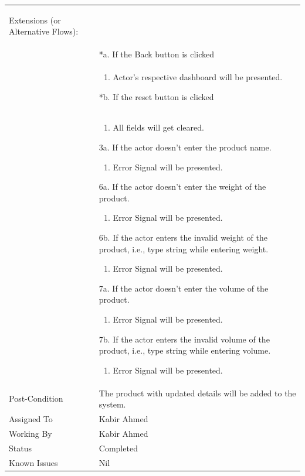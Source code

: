 \documentclass[12pt,a4paper]{article}
\begin{document}
\begin{longtable}{| p{3cm}|p{12cm}|}
\begin{enumerate}
\end{enumerate}

Extensions (or Alternative Flows):\\
& *a. If the Back button is clicked \\
& \begin{enumerate}
		\item Actor's respective dashboard will be presented.
	\end{enumerate}
*b. If the reset button is clicked \\
&	\begin{enumerate}
		\item All fields will get cleared.
	\end{enumerate}
3a. If the actor doesn't enter the product name.
 	\begin{enumerate}
		\item Error Signal will be presented.
	\end{enumerate}
6a. If the actor doesn't enter the weight of the product.
 	\begin{enumerate}
		\item Error Signal will be presented.
	\end{enumerate}
6b. If the actor enters the invalid weight of the product, i.e., type string while entering weight.
 	\begin{enumerate}
		\item Error Signal will be presented.
	\end{enumerate}
7a. If the actor doesn't enter the volume of the product.
 	\begin{enumerate}
		\item Error Signal will be presented.
	\end{enumerate}
7b. If the actor enters the invalid volume of the product, i.e., type string while entering volume.
 	\begin{enumerate}
		\item Error Signal will be presented.
	\end{enumerate}
\\ \hline
Post-Condition &    The product with updated details will be added to the system.\\ \hline
Assigned To &  Kabir Ahmed
\\ \hline
Working By &   Kabir Ahmed
\\ \hline
Status & 	Completed	
\\ \hline
Known Issues & Nil
\\\hline
\end{longtable}
\end{document}
